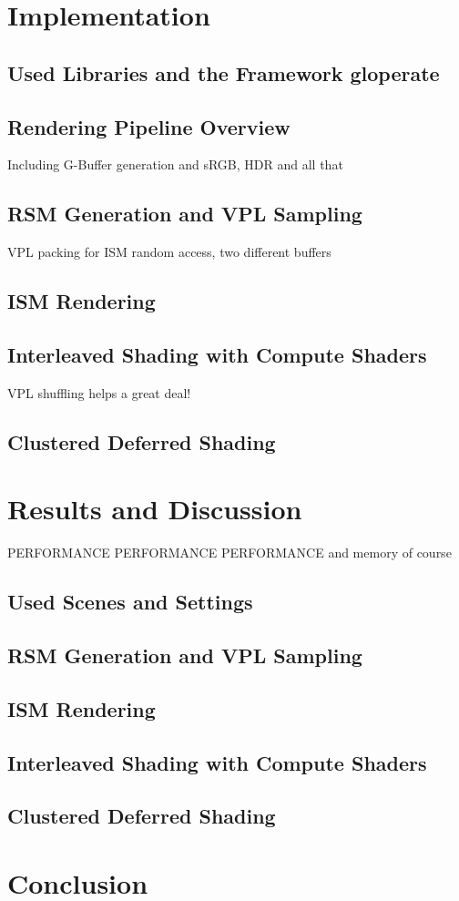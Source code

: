 

\chapter{Implementation}

\section{Used Libraries and the Framework gloperate}

\section{Rendering Pipeline Overview}
Including G-Buffer generation and sRGB, HDR and all that

\section{RSM Generation and VPL Sampling}
VPL packing for ISM random access, two different buffers

\section{ISM Rendering}

\section{Interleaved Shading with Compute Shaders}
VPL shuffling helps a great deal!

\section{Clustered Deferred Shading}




\chapter{Results and Discussion}

PERFORMANCE PERFORMANCE PERFORMANCE
and memory of course
\section{Used Scenes and Settings}

\section{RSM Generation and VPL Sampling}

\section{ISM Rendering}

\section{Interleaved Shading with Compute Shaders}

\section{Clustered Deferred Shading}





\chapter{Conclusion}
